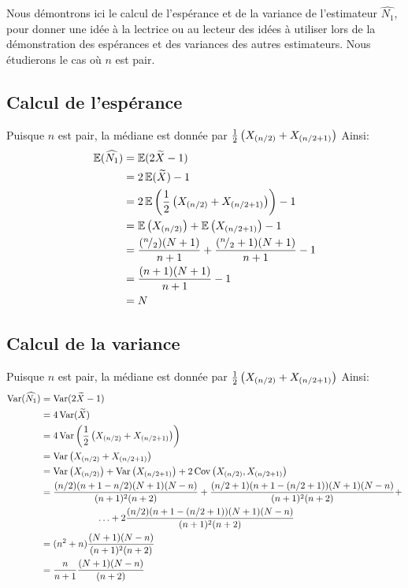 \documentclass[10pt]{article}
\newcommand*\rfrac[2]{{}^{#1}\!/_{#2}}
\begin{document}
Nous démontrons ici le calcul de l'espérance et de la variance de
l'estimateur \(\widehat{N_1}\), pour donner une idée à la lectrice ou au
lecteur des idées à utiliser lors de la démonstration des espérances et
des variances des autres estimateurs. Nous étudierons le cas où \(n\)
est pair.

\hypertarget{calcul-de-lesperance}{%
\subsection{Calcul de l'espérance}\label{calcul-de-lesperance}}

Puisque \(n\) est pair, la médiane est donnée par
\(\frac{1}{2}\left(X_{\left(n/2\right)}+X_{\left(n/2+1\right)}\right)\) Ainsi: \begin{align*}
\esp(\widehat{N_1}) &= \esp(2\widetilde{X}-1) \\
&= 2\esp(\widetilde{X})-1 \\
&= 2\esp\lr{\frac{1}{2}\lr{X_{\lr{n/2}}+X_{\lr{n/2+1}}}}-1 \\
&= \esp\lr{X_{\lr{n/2}}}+\esp\lr{X_{\lr{n/2+1}}}-1 \\
&= \frac{(\rfrac{n}{2})(N+1)}{n+1}+ \frac{(\rfrac{n}{2}+1)(N+1)}{n+1}-1 \\
&= \frac{(n+1)(N+1)}{n+1}-1 \\
&= N
\end{align*}

\hypertarget{calcul-de-la-variance}{%
\subsection{Calcul de la variance}\label{calcul-de-la-variance}}

Puisque \(n\) est pair, la médiane est donnée par
\(\frac{1}{2}\left(X_{\left(n/2\right)}+X_{\left(n/2+1\right)}\right)\) Ainsi: \begin{align*}
\operatorname{Var}(\widehat{N_1}) &= \operatorname{Var}(2\widetilde{X}-1) \\
&= 4\operatorname{Var}(\widetilde{X}) \\
&= 4\operatorname{Var}\left(\frac{1}{2}\left(X_{\left(n/2\right)}+X_{\left(n/2+1\right)}\right)\right) \\
&= \operatorname{Var}\left(X_{\left(n/2\right)}+X_{\left(n/2+1\right)}\right) \\
&= \operatorname{Var}\left(X_{\left(n/2\right)}\right)+\operatorname{Var}\left(X_{\left(n/2+1\right)}\right)+2\operatorname{Cov}\left(X_{\left(n/2\right)},X_{\left(n/2+1\right)}\right) \\
&= \frac{(n/2)(n+1-n/2)(N+1)(N-n)}{(n+1)^2(n+2)}+\frac{(n/2+1)(n+1-(n/2+1))(N+1)(N-n)}{(n+1)^2(n+2)}+ \\
&\qquad\qquad\qquad \ldots+2\frac{(n/2)(n+1-(n/2+1))(N+1)(N-n)}{(n+1)^2(n+2)} \\
&= (n^2+n)\frac{(N+1)(N-n)}{(n+1)^2(n+2)} \\
&= \frac{n}{n+1}\frac{(N+1)(N-n)}{(n+2)}
\end{align*}
\end{document}
